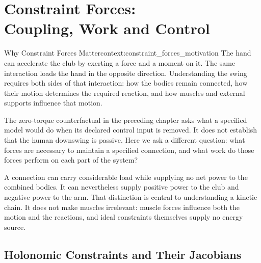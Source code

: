 \chapter[Constraint Forces: Coupling, Work and Control]{Constraint Forces:\\Coupling, Work and Control}
\raggedbottom
\label{ch:constraint_forces}

\begin{laymansbox}{Why Constraint Forces Matter}{context:constraint_forces_motivation}
The hand can accelerate the club by exerting a force and a moment on it. The same interaction loads the hand in the opposite direction. Understanding the swing requires both sides of that interaction: how the bodies remain connected, how their motion determines the required reaction, and how muscles and external supports influence that motion.

The zero-torque counterfactual in the preceding chapter asks what a specified model would do when its declared control input is removed. It does not establish that the human downswing is passive. Here we ask a different question: what forces are necessary to maintain a specified connection, and what work do those forces perform on each part of the system?

A connection can carry considerable load while supplying no net power to the combined bodies. It can nevertheless supply positive power to the club and negative power to the arm. That distinction is central to understanding a kinetic chain. It does not make muscles irrelevant: muscle forces influence both the motion and the reactions, and ideal constraints themselves supply no energy source.
\end{laymansbox}

\section{Holonomic Constraints and Their Jacobians}
\label{sec:holonomic_constraints}


